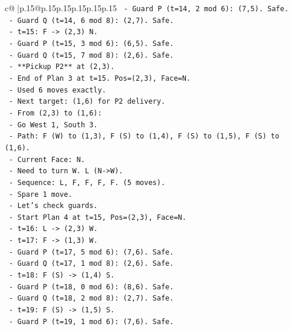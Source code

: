 \documentclass{article}
\begin{document}
{\begin{supertabular}{c@{$\;$}|p{.15\linewidth}@{}p{.15\linewidth}p{.15\linewidth}p{.15\linewidth}p{.15\linewidth}p{.15\linewidth}}
{{{\texttt{          {-} Guard P (t=14, 2 mod 6): (7,5). Safe.} \\
\texttt{          {-} Guard Q (t=14, 6 mod 8): (2,7). Safe.} \\
\texttt{        {-} t=15: F {-}> (2,3) N.} \\
\texttt{          {-} Guard P (t=15, 3 mod 6): (6,5). Safe.} \\
\texttt{          {-} Guard Q (t=15, 7 mod 8): (2,6). Safe.} \\
\texttt{          {-} **Pickup P2** at (2,3).} \\
\texttt{        {-} End of Plan 3 at t=15. Pos=(2,3), Face=N.} \\
\texttt{        {-} Used 6 moves exactly.} \\
\texttt{        {-} Next target: (1,6) for P2 delivery.} \\
\texttt{        {-} From (2,3) to (1,6):} \\
\texttt{          {-} Go West 1, South 3.} \\
\texttt{          {-} Path: F (W) to (1,3), F (S) to (1,4), F (S) to (1,5), F (S) to (1,6).} \\
\texttt{          {-} Current Face: N.} \\
\texttt{          {-} Need to turn W. L (N{-}>W).} \\
\texttt{          {-} Sequence: L, F, F, F, F. (5 moves).} \\
\texttt{          {-} Spare 1 move.} \\
\texttt{          {-} Let's check guards.} \\
\texttt{          {-} Start Plan 4 at t=15, Pos=(2,3), Face=N.} \\
\texttt{          {-} t=16: L {-}> (2,3) W.} \\
\texttt{          {-} t=17: F {-}> (1,3) W.} \\
\texttt{            {-} Guard P (t=17, 5 mod 6): (7,6). Safe.} \\
\texttt{            {-} Guard Q (t=17, 1 mod 8): (2,6). Safe.} \\
\texttt{          {-} t=18: F (S) {-}> (1,4) S.} \\
\texttt{            {-} Guard P (t=18, 0 mod 6): (8,6). Safe.} \\
\texttt{            {-} Guard Q (t=18, 2 mod 8): (2,7). Safe.} \\
\texttt{          {-} t=19: F (S) {-}> (1,5) S.} \\
\texttt{            {-} Guard P (t=19, 1 mod 6): (7,6). Safe.} \\
}}}
\end{supertabular}}
\end{document}
